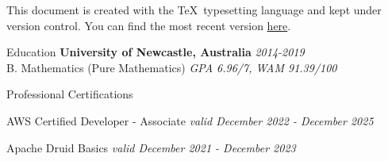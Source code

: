 \documentclass{resume} %
\begin{document}
This document is created with the \TeX \ typesetting language and kept under version control.
You can find the most recent version \href{https://github.com/joegurr/resume/blob/main/resume.pdf}{here}.


\begin{rSection}{Education}
    {\bf University of Newcastle, Australia} \hfill {\em 2014-2019}
    \\ B. Mathematics (Pure Mathematics) \hfill {\em GPA 6.96/7, WAM 91.39/100}
\end{rSection}


\begin{rSection}{Professional Certifications}
    \item AWS Certified Developer - Associate \hfill {\em valid December 2022 - December 2025}
    \item Apache Druid Basics \hfill {\em valid December 2021 - December 2023}
\end{rSection}

\end{document}
